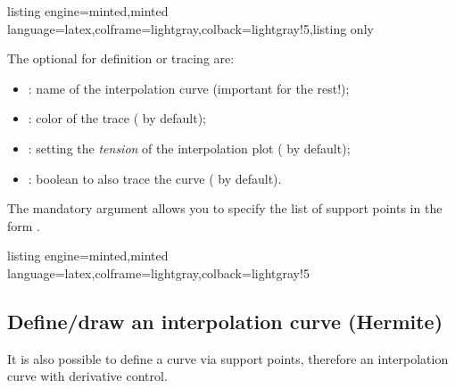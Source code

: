 \documentclass[11pt,a4paper]{ltxdoc}
\begin{document}
\begin{tcblisting}{listing engine=minted,minted language=latex,colframe=lightgray,colback=lightgray!5,listing only}
\end{tcblisting}

The optional \MontreCode{[keys]} for definition or tracing are:

\smallskip

\begin{itemize}
	\item {}: name of the interpolation curve (important for the rest!);
	\item {}: color of the trace ( by default);
	\item {}: setting the \textit{tension} of the interpolation plot ( by default);
	\item {}: boolean to also trace the curve ( by default).
\end{itemize}

The mandatory argument allows you to specify the list of support points in the form .

\begin{tcblisting}{listing engine=minted,minted language=latex,colframe=lightgray,colback=lightgray!5}
\begin{GraphTikz}%
	[x=0.8cm,y=1cm,Xmin=-7,Xmax=4,Ymin=-3,Ymax=5]
\end{GraphTikz}
\end{tcblisting}

\newpage

\subsection{Define/draw an interpolation curve (Hermite)}\label{deftracfctspline}

It is also possible to define a curve via support points, therefore an interpolation curve with derivative control.

\smallskip
\end{document}
